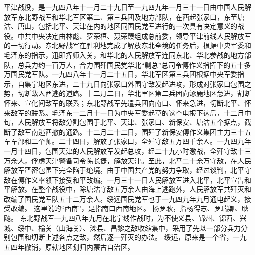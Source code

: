 \begin{maonote}
平津战役，是一九四八年十一月二十九日至一九四九年一月三十一日由中国人民解放军东北野战军和华北军区第二、第三兵团及地方部队，在西起张家口，东至塘沽、唐山，包括北平、天津在内的地区同国民党军进行的一次具有决定意义的战役。中共中央决定由林彪、罗荣桓、聂荣臻组成总前委，领导平津前线人民解放军的一切行动。东北野战军在胜利地完成了解放东北全境的任务后，根据中央军委和毛泽东的指示，迅即挥师入关，和华北的人民解放军连同东北、华北参战的地方部队，总兵力约一百万人，合力围歼国民党华北“剿总”总司令傅作义指挥下的五十多万国民党军队。一九四八年十一月二十五日，华北军区第三兵团根据中央军委指示，自集宁地区东进，二十九日向张家口外围守敌发起进攻，形成对张家口包围之势，切断敌人西逃的道路。十二月二日，华北军区第二兵团向涿鹿地区急进，割断怀来、宣化间敌军的联系；东北野战军先遣兵团向南口、怀来急进，切断北平、怀来敌军的联系。毛泽东十二月十一日为中央军委起草的这个电报下达后，十二月中旬，人民解放军将敌分割包围于北平、天津、张家口、新保安、塘沽五个据点，截断了敌军南逃西撤的通路。十二月二十二日，围歼了新保安傅作义集团主力三十五军军部和二个师。二十四日，解放了张家口，全歼守敌五万四千余人。一九四九年一月十四日，包围天津的人民解放军发起总攻，经二十九小时激战，全歼守敌十三万余人，俘虏天津警备司令陈长捷，解放天津。至此，北平二十余万守敌，在人民解放军严密包围下完全陷于绝境。由于中国共产党的努力争取，经过谈判，北平守敌在傅作义率领下接受和平改编。一月三十一日人民解放军进入北平，北平宣告和平解放。在整个战役中，除塘沽守敌五万余人由海上逃跑外，人民解放军共歼灭和改编了国民党军队五十二万余人。绥远国民党军也于一九四九年九月通电起义，接受改编。
这里说的“西南”，是指南口西南地区。
杨罗耿，指杨得志、罗瑞卿、耿飚。
东北野战军一九四八年九月在北宁线作战时，为不使义县、锦州、锦西、兴城、绥中、榆关（山海关）、滦县、昌黎之敌收缩集中，采用了先以一部分兵力分别包围和切断上述各点之敌，然后逐一歼灭的办法。
绥远，原来是一个省，一九五四年撤销，原辖地区划归内蒙古自治区。
\end{maonote}
